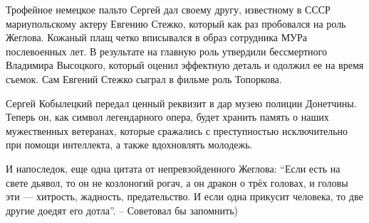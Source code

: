 Трофейное немецкое пальто Сергей дал своему другу, известному в СССР
мариупольскому актеру Евгению Стежко, который  как раз пробовался на роль
Жеглова. Кожаный плащ четко вписывался в образ сотрудника МУРа послевоенных
лет.  В результате на главную роль утвердили бессмертного Владимира Высоцкого,
который оценил эффектную деталь и одолжил ее на время съемок. Сам Евгений
Стежко сыграл в фильме роль Топоркова.

Сергей Кобылецкий передал ценный реквизит в дар музею полиции Донетчины. Теперь
он, как символ легендарного опера, будет хранить память о наших мужественных
ветеранах, которые сражались с преступностью исключительно при помощи
интеллекта, а также вдохновлять молодежь.

И напоследок, еще одна цитата от непревзойденного Жеглова: \enquote{Если есть на свете
дьявол, то он не козлоногий рогач, а он дракон о трёх головах, и головы эти —
хитрость, жадность, предательство. И если одна прикусит человека, то две другие
доедят его дотла}. – Советовал бы запомнить)

